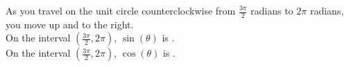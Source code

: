 \documentclass{ximera}
\begin{document}
\begin{example}
\begin{question}
As you travel on the unit circle counterclockwise from $\frac{3\pi}{2}$ radians to $2\pi$ radians, you move up and to the right. \\


On the interval $\left (\frac{3\pi}{2}, 2\pi \right)$, $\sin(\theta)$ is . \\


On the interval $\left (\frac{3\pi}{2}, 2\pi \right)$, $\cos(\theta)$ is . \\

\end{question}




















\end{example}
\end{document}
